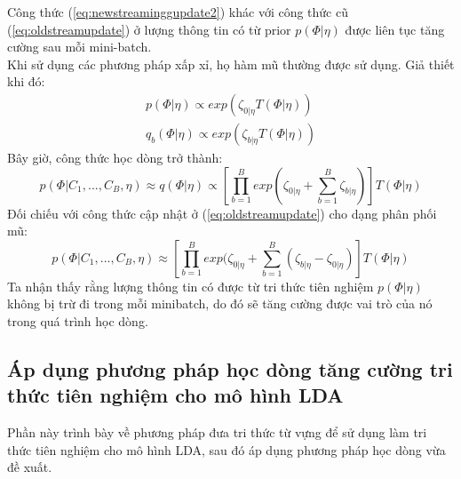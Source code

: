 \documentclass[fontsize=13pt]{scrartcl}
\begin{document}
Công thức (\ref{eq:newstreaminggupdate2}) khác với công thức cũ (\ref{eq:oldstreamupdate}) ở lượng thông tin có từ prior $p(\Phi | \eta)$ được liên tục tăng cường sau mỗi mini-batch.\\
Khi sử dụng các phương pháp xấp xỉ, họ hàm mũ thường được sử dụng. Giả thiết khi đó:
\begin{align}
 p (\Phi | \eta) \propto exp(\zeta_{0|\eta} T(\Phi | \eta)) \\
 q_{b}(\Phi | \eta ) \propto exp(\zeta_{b|\eta} T(\Phi | \eta))
\end{align}
Bây giờ, công thức học dòng trở thành:
\begin{equation}\label{eq:newstreamingupdate}
p (\Phi | C_1,...,C_B,\eta) \approx q(\Phi | \eta) \propto [\prod_{b=1}^{B} exp(\zeta_{0|\eta} + \sum_{b=1}^{B} \zeta_{b|\eta})]T(\Phi | \eta)
\end{equation}
Đối chiếu với công thức cập nhật ở (\ref{eq:oldstreamupdate}) cho dạng phân phối mũ:
\begin{equation}
p (\Phi | C_1,...,C_B,\eta) \approx [\prod_{b=1}^{B} exp(\zeta_{0|\eta} + \sum_{b=1}^{B} (\zeta_{b|\eta}-\zeta_{0|\eta})]T(\Phi | \eta)
\end{equation}
Ta nhận thấy rằng lượng thông tin có được từ tri thức tiên nghiệm $p(\Phi | \eta)$ không bị trừ đi trong mỗi minibatch, do đó sẽ tăng cường được vai trò của nó trong quá trình học dòng.
\subsection{Áp dụng phương pháp học dòng tăng cường tri thức tiên nghiệm cho mô hình LDA}
Phần này trình bày về phương pháp đưa tri thức từ vựng để sử dụng làm tri thức tiên nghiệm cho mô hình LDA, sau đó áp dụng phương pháp học dòng vừa đề xuất.
\end{document}
